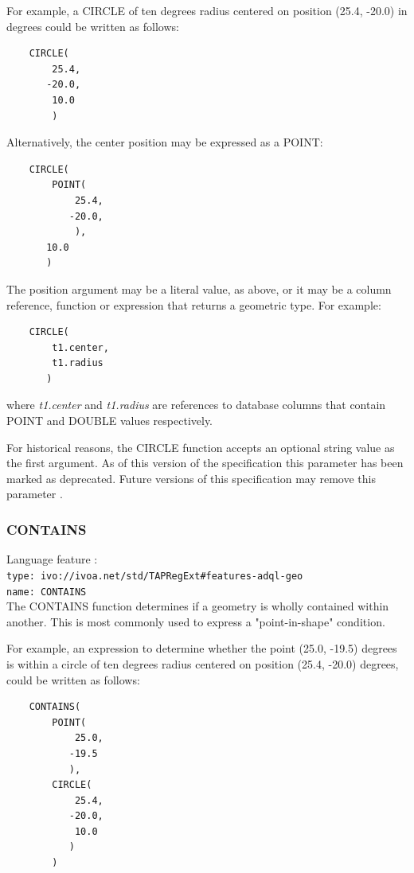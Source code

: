 \documentclass[11pt,a4paper]{ivoa}
\begin{document}
For example, a CIRCLE of ten degrees radius centered on position
(25.4, -20.0) in degrees could be written as follows:
\begin{verbatim}
    CIRCLE(
        25.4,
       -20.0,
        10.0
        )
\end{verbatim}

Alternatively, the center position may be expressed as a POINT:
\begin{verbatim}
    CIRCLE(
        POINT(
            25.4,
           -20.0,
            ),
       10.0
       )
\end{verbatim}

The position argument may be a literal value, as above, or it may be a
column reference, function or expression that returns a geometric type.
For example:
\begin{verbatim}
    CIRCLE(
        t1.center,
        t1.radius
       )
\end{verbatim}
where \textit{t1.center} and \textit{t1.radius} are references to
database columns that contain POINT and DOUBLE values respectively.

For historical reasons, the CIRCLE function accepts an optional string
value as the first argument.
As of this version of the specification this parameter has been
marked as deprecated.
Future versions of this specification may remove this parameter
.

\subsubsection{CONTAINS}
\label{sec:functions.geom.contains}
{\footnotesize Language feature :}\\
{\footnotesize \verb|type: ivo://ivoa.net/std/TAPRegExt#features-adql-geo|}\\
{\footnotesize \verb|name: CONTAINS|}\\

The CONTAINS function determines if a geometry is wholly contained within
another. This is most commonly used to express a "point-in-shape" condition.

For example, an expression to determine whether the point (25.0, -19.5) degrees
is within a circle of ten degrees radius centered on position (25.4, -20.0) degrees,
could be written as follows:
\begin{verbatim}
    CONTAINS(
        POINT(
            25.0,
           -19.5
           ),
        CIRCLE(
            25.4,
           -20.0,
            10.0
           )
        )
\end{verbatim}
\end{document}
